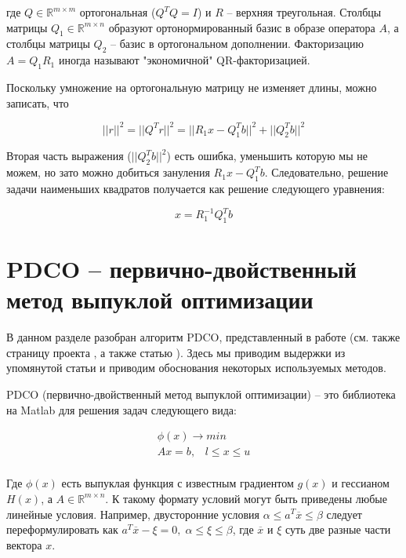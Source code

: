 \documentclass[a4paper, 12pt, titlepage]{article}
\theoremstyle{definition}
\theoremstyle{plain}
\theoremstyle{plain}
\begin{document}
где $Q \in \mathbb{R}^{m \times m}$ ортогональная ($Q^{T} Q = I$) и $R$ --
верхняя треугольная. Столбцы матрицы $Q_{1} \in \mathbb{R}^{m \times n}$
образуют ортонормированный базис в образе оператора $A$, а столбцы матрицы 
$Q_{2}$ -- базис в ортогональном дополнении. Факторизацию
$A = Q_{1} R_{1}$ иногда называют "экономичной" QR-факторизацией.

Поскольку умножение на ортогональную матрицу не изменяет длины, можно записать,
что

\begin{equation}
 ||r||^{2} = ||Q^{T} r||^{2} =
 ||R_{1} x - Q_{1}^{T} b||^{2} + ||Q_{2}^{T} b||^{2}
\end{equation}

Вторая часть выражения ($||Q_{2}^{T} b||^{2}$) есть ошибка, уменьшить которую
мы не можем, но зато можно добиться зануления $R_{1} x - Q_{1}^{T} b$.
Следовательно, решение задачи наименьших квадратов получается как решение
следующего уравнения:

\begin{equation}
 x = R_{1}^{-1} Q_{1}^{T} b
\end{equation}





\section{PDCO -- первично-двойственный метод выпуклой оптимизации}

В данном разделе разобран алгоритм PDCO, представленный в работе
\cite{Saunders2013} (см. также страницу проекта \cite{PDCO}, а также статью 
\cite{ChenDonohoSaunders2001}). Здесь мы приводим
выдержки из упомянутой статьи и приводим обоснования некоторых используемых 
методов.

PDCO (первично-двойственный метод выпуклой оптимизации) -- это библиотека на 
Matlab  для решения задач следующего вида:

\begin{equation}
 \begin{aligned}
 \phi(x) \to min \\
 Ax = b, \;\;\; l \leq x \leq u \\
 \end{aligned}
\end{equation}

Где $\phi(x)$ есть выпуклая функция с известным градиентом $g(x)$ и гессианом
$H(x)$, а $A \in \mathbb{R}^{m \times n}$. К такому формату условий могут быть 
приведены любые линейные условия. Например, двусторонние условия
$\alpha \leq a^{T} \overline{x} \leq \beta$ следует переформулировать как
$a^{T} \overline{x} - \xi = 0, \; \alpha \leq \xi \leq \beta$, где 
$\overline{x}$ и $\xi$ суть две разные части вектора $x$.
\end{document}
